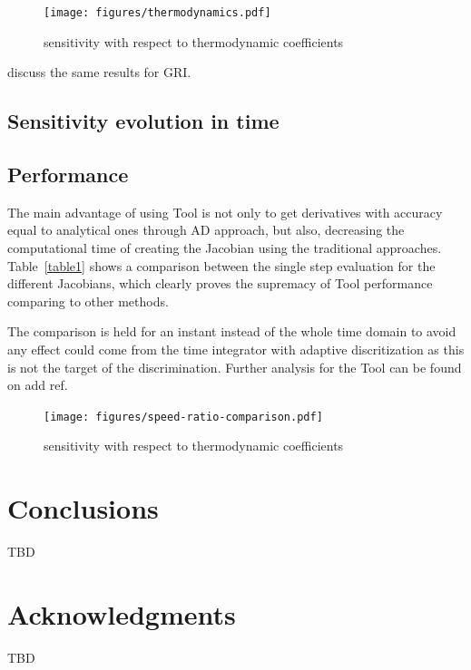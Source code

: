 \documentclass[preprint,review,12pt]{elsarticle}
\begin{document}
\begin{figure}
\centering
 {\texttt{[image: figures/thermodynamics.pdf]}}
\caption{sensitivity with respect to thermodynamic coefficients}
    \label{fig:figure10}
\end{figure}
 {\color{red} discuss the same results for GRI}.
\subsection{Sensitivity evolution in time}

\subsection{Performance}
The main advantage of using {\color{red} Tool} is not only to get derivatives with accuracy equal to analytical ones through AD approach, but also, decreasing the computational time of creating the Jacobian using the traditional approaches. Table~\ref{table1} shows a comparison between the single step evaluation for the different Jacobians, which clearly proves the supremacy of   {\color{red} Tool}  performance comparing to other methods. 


The comparison is held for an instant instead of the whole time domain to avoid any effect could come from the time integrator with adaptive discritization as this is not the target of the discrimination. Further analysis for the {\color{red} Tool} can be found on {\color{red} add ref}.
\begin{figure}
\centering
 {\texttt{[image: figures/speed-ratio-comparison.pdf]}}
\caption{sensitivity with respect to thermodynamic coefficients}
    \label{fig:figure10}
\end{figure}
\section{Conclusions}
\label{Conclusions}

TBD

\section*{Acknowledgments}
\label{Acknowledgments}

TBD 



\end{document}
